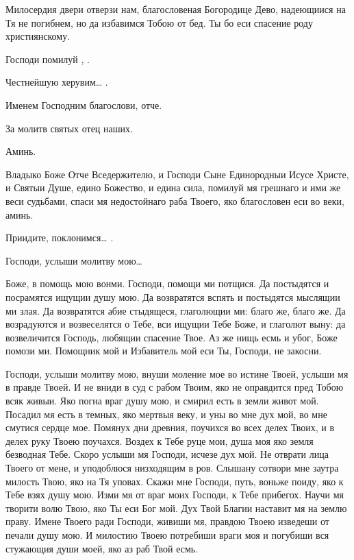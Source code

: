 \begin{mymulticols}
 Милосердия двери отверзи нам, благословеная Богородице Дево, надеющиися на Тя не погибнем, но да избавимся Тобою от бед. Ты бо еси спасение роду християнскому.

Господи помилуй , .

Честнейшую херувим… .

Именем Господним благослови, отче.

За молитв святых отец наших.

Аминь.




Владыко Боже Отче Вседержителю, и Господи Сыне Единородныи Исусе Христе, и Святыи Душе, едино Божество, и едина сила, помилуй мя грешнаго и ими же веси судьбами, спаси мя недостойнаго раба Твоего, яко благословен еси во веки, аминь.

Приидите, поклонимся… .


 Господи, услыши молитву мою…




Боже, в помощь мою вонми. Господи, помощи ми потщися. Да постыдятся и посрамятся ищущии душу мою. Да возвратятся вспять и постыдятся мыслящии ми злая. Да возвратятся абие стыдящеся, глаголющии ми: благо же, благо же. Да возрадуются и возвеселятся о Тебе, вси ищущии Тебе Боже, и глаголют выну: да возвеличится Господь, любящии спасение Твое. Аз же нищь есмь и убог, Боже помози ми. Помощник мой и Избавитель мой еси Ты, Господи, не закосни.




Господи, услыши молитву мою, внуши моление мое во истине Твоей, услыши мя в правде Твоей. И не вниди в суд с рабом Твоим, яко не оправдится пред Тобою всяк живыи. Яко погна враг душу мою, и смирил есть в земли живот мой. Посадил мя есть в темных, яко мертвыя веку, и уны во мне дух мой, во мне смутися сердце мое. Помянух дни древния, поучихся во всех делех Твоих, и в делех руку Твоею поучахся. Воздех к Тебе руце мои, душа моя яко земля безводная Тебе. Скоро услыши мя Господи, исчезе дух мой. Не отврати лица Твоего от мене, и уподоблюся низходящим в ров. Слышану сотвори мне заутра милость Твою, яко на Тя уповах. Скажи мне Господи, путь, воньже поиду, яко к Тебе взях душу мою. Изми мя от враг моих Господи, к Тебе прибегох. Научи мя творити волю Твою, яко Ты еси Бог мой. Дух Твой Благии наставит мя на землю праву. Имене Твоего ради Господи, живиши мя, правдою Твоею изведеши от печали душу мою. И милостию Твоею потребиши враги моя и погубиши вся стужающия души моей, яко аз раб Твой есмь.


\end{mymulticols}
